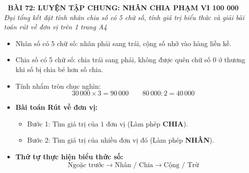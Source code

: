 \documentclass[11pt,a4paper]{article}
\begin{document}
\begin{tcolorbox}[
  enhanced,
  colback=white,
  colframe=primary,
  arc=3mm,
  boxrule=1.2pt,
  left=4mm, right=4mm, top=2.5mm, bottom=2.5mm,
  drop shadow=black!10!white
]
  \centering
  {\Large\bfseries\color{primary}\faBookmark\ BÀI 72: LUYỆN TẬP CHUNG: NHÂN CHIA PHẠM VI 100 000}\\[1.5mm]
  {\small\itshape\color{black!75}Đại tổng kết đặt tính nhân chia số có 5 chữ số, tính giá trị biểu thức và giải bài toán rút về đơn vị trên 1 trang A4}
\end{tcolorbox}

\vspace{-2mm}


\noindent
\begin{minipage}[t]{0.49\textwidth}\vspace{0pt}
\begin{tcolorbox}[
  enhanced,
  colback=blue!4!white,
  colframe=blue!75!black,
  arc=2mm, boxrule=0.8pt,
  left=2mm, right=2mm, top=1.8mm, bottom=1.8mm,
  title={\footnotesize\bfseries\color{white}\faCalculator\ 1. Kĩ thuật nhân chia 5 chữ số}
]
{\footnotesize
\begin{itemize}\setlength{\itemsep}{1.5pt}\setlength{\leftskip}{-2.5mm}
  \item Nhân số có 5 chữ số: nhân phải sang trái, cộng số nhớ vào hàng liền kề.
  \item Chia số có 5 chữ số: chia trái sang phải, không được quên chữ số $0$ ở thương khi số bị chia bé hơn số chia.
  \item Tính nhẩm tròn chục nghìn:
  $$30\,000 \times 3 = 90\,000 \qquad 80\,000 : 2 = 40\,000$$
\end{itemize}
}
\end{tcolorbox}
\end{minipage}
\hfill
\begin{minipage}[t]{0.49\textwidth}\vspace{0pt}
\begin{tcolorbox}[
  enhanced,
  colback=teal!4!white,
  colframe=teal!75!black,
  arc=2mm, boxrule=0.8pt,
  left=2mm, right=2mm, top=1.8mm, bottom=1.8mm,
  title={\footnotesize\bfseries\color{white}\faSliders\ 2. Bài toán giải bằng 2 bước tính}
]
{\footnotesize
\begin{itemize}\setlength{\itemsep}{1.5pt}\setlength{\leftskip}{-2.5mm}
  \item \textbf{Bài toán Rút về đơn vị:}
  \begin{itemize}\setlength{\itemsep}{0.5pt}\setlength{\leftskip}{-2.5mm}
    \item Bước 1: Tìm giá trị của $1$ đơn vị (Làm phép \textbf{CHIA}).
    \item Bước 2: Tìm giá trị của nhiều đơn vị đó (Làm phép \textbf{NHÂN}).
  \end{itemize}
  \item \textbf{Thứ tự thực hiện biểu thức số:}
  $$\text{Ngoặc trước} \to \text{Nhân / Chia} \to \text{Cộng / Trừ}$$
\end{itemize}
}
\end{tcolorbox}
\end{minipage}
\end{document}
